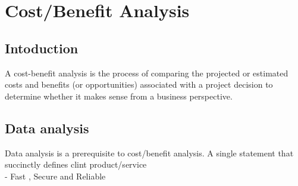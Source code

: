 \documentclass[a4paper,12pt]{report}
\begin{document}
	\tableofcontents
	\listoffigures
	\newpage
	\chapter{Cost/Benefit Analysis}
	\section{Intoduction}
	A cost-benefit analysis is the process of comparing the projected or estimated costs and benefits (or opportunities) associated with a project decision to determine whether it makes sense from a business perspective.\\
	\section{Data analysis}
	Data analysis is a prerequisite to cost/benefit analysis. A single statement that succinctly defines clint product/service\\
	- Fast , Secure and Reliable
\end{document}

